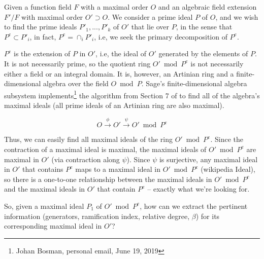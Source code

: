 \documentclass{article}
\begin{document}
Given a function field $F$ with a maximal order $O$ and an
algebraic field extension $F'/F$ with maximal order $O' \supset O$.
We consider a prime ideal $P$ of $O$, and we wish to find the prime
ideals $P'_1,...,P'_k$ of $O'$ that lie over $P$, in the sense that
$P^e \subset P'_i$, in fact, $P^e = \cap_i P'_i$, i.e, we seek the
primary decomposition of $P^e$.

$P^e$ is the extension of $P$ in $O'$, i.e, the ideal of $O'$
generated by the elements of $P$.  It is not necessarily prime, so the
quotient ring $O' \bmod P^e$ is not necessarily either a field or an
integral domain.  It is, however, an Artinian ring and a
finite-dimensional algebra over the field $O \bmod P$.  Sage's
finite-dimensional algebra subsystem implements\footnote{Johan Bosman,
  personal email, June 19, 2019} the algorithm from Section 7 of
\cite{khuri} to find all of the algebra's maximal ideals (all
prime ideals of an Artinian ring are also maximal).

$$O \stackrel{\phi}{\rightarrow} O' \stackrel{\psi}{\rightarrow} O'\bmod P^e$$

Thus, we can easily find all maximal ideals of the ring $O' \bmod P^e$.  Since
the contraction of a maximal ideal is maximal, the maximal ideals of
$O'\bmod P^e$ are maximal in $O'$ (via contraction along $\psi$).  Since
$\psi$ is surjective, any maximal ideal in $O'$ that contains $P^e$ maps
to a maximal ideal in $O'\bmod P^e$ (wikipedia Ideal), so there is a one-to-one
relationship between the maximal ideals in $O'\bmod P^e$ and the maximal ideals in $O'$
that contain $P^e$ -- exactly what we're looking for.

So, given a maximal ideal $P_1$ of $O'\bmod P^e$, how can we extract the
pertinent information (generators, ramification index, relative
degree, $\beta$) for its corresponding maximal ideal in $O'$?
\end{document}
